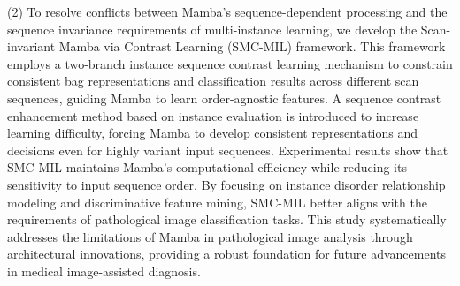 \begin{eabstract}
(2) To resolve conflicts between Mamba's sequence-dependent processing and the sequence invariance requirements of multi-instance learning, we develop the Scan-invariant Mamba via Contrast Learning (SMC-MIL) framework. This framework employs a two-branch instance sequence contrast learning mechanism to constrain consistent bag representations and classification results across different scan sequences, guiding Mamba to learn order-agnostic features. A sequence contrast enhancement method based on instance evaluation is introduced to increase learning difficulty, forcing Mamba to develop consistent representations and decisions even for highly variant input sequences. Experimental results show that SMC-MIL maintains Mamba's computational efficiency while reducing its sensitivity to input sequence order. By focusing on instance disorder relationship modeling and discriminative feature mining, SMC-MIL better aligns with the requirements of pathological image classification tasks.
This study systematically addresses the limitations of Mamba in pathological image analysis through architectural innovations, providing a robust foundation for future advancements in medical image-assisted diagnosis.

\end{eabstract}

